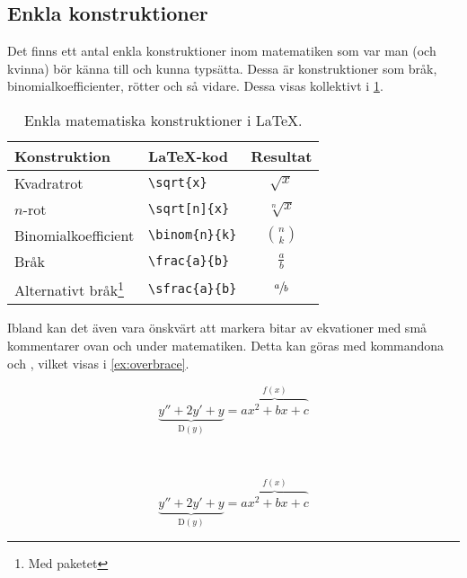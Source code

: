 \documentclass[10pt,../../a4.tex]{subfiles}
\begin{document}
\subsection{Enkla konstruktioner} %
Det finns ett antal enkla konstruktioner inom matematiken som var man
(och kvinna) bör känna till och kunna typsätta. Dessa är konstruktioner
som bråk, binomialkoefficienter, rötter och så vidare. Dessa visas
kollektivt i \cref{tab:math:enkla}.

\begin{table}[p]
	\centering
	\caption{Enkla matematiska konstruktioner i \LaTeX{}.}
	\label{tab:math:enkla}
	\begin{minipage}{0.66\textwidth}
	\centering
	\begin{tabular}{llc}
		\toprule 
		Konstruktion & \LaTeX-kod & Resultat  \\
		\midrule 
		Kvadratrot & \verb|\sqrt{x}| & \(\sqrt{x}\) \\
		\(n\)-rot & \verb|\sqrt[n]{x}| & \(\sqrt[n]{x}\) \\
		Binomialkoefficient & \verb|\binom{n}{k}| & \(\binom{n}{k}\) \\
		Bråk & \verb|\frac{a}{b}| & \(\frac{a}{b}\) \\
		Alternativt bråk\footnote{Med paketet \pack{xfrac}} & \verb|\sfrac{a}{b}| & \(\sfrac{a}{b}\) \\
		\bottomrule 
	\end{tabular}
	\end{minipage}
\end{table}

Ibland kan det även vara önskvärt att markera bitar av ekvationer med små
kommentarer ovan och under matematiken. Detta kan göras med kommandona
 och , vilket visas i \cref{ex:overbrace}.

\begin{kod}[p]
	\centering
	\begin{minipage}{0.8\textwidth} %
		\begin{latexcode}
\begin{equation*}
\underbrace{y'' + 2y' + y}_{\mathrm{D}(y)}
= \overbrace{ax^2+bx+c}^{f(x)}
\end{equation*}
		\end{latexcode}
	\end{minipage}
	\medskip\\
	\begin{minipage}{0.8\textwidth} %
		\begin{equation*}
			\underbrace{y'' + 2y' + y}_{\mathrm{D}(y)}
			= \overbrace{ax^2+bx+c}^{f(x)}
		\end{equation*}
	\end{minipage}		
	\caption{Annotering med  och .}
	\label{ex:overbrace}
\end{kod}
\end{document}
